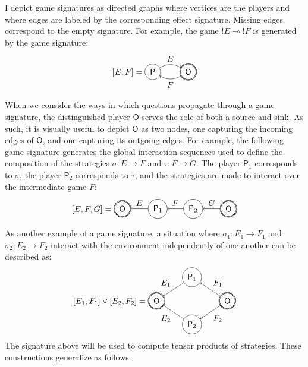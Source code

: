 \documentclass[11pt,oneside]{book}
\theoremstyle{definition}
\newcommand{\kw}[1]{\ensuremath{ \mathsf{#1} }}
\begin{document}
I depict game signatures as directed graphs
where vertices are the players and
where edges are labeled by the corresponding effect signature.
Missing edges correspond to the empty signature.
For example,
the game ${!E} \multimap {!F}$ is generated by
the game signature:
\[
  [E,F] =
  \begin{tikzpicture}[baseline=(O.base),scale=1.5]
    \node[circle,draw,double] (O) at (0,0) {$\kw{O}$};
    \node[circle,draw] (P) at (-1,0) {$\kw{P}$};
    \path[->] (P) edge[bend left] node[above] {$E$} (O);
    \path[->] (O) edge[bend left] node[below] {$F$} (P);
  \end{tikzpicture}
\]

When we consider the ways in which questions propagate
through a game signature, %
the distinguished player $\kw{O}$ serves the role
of both a source and sink.
As such, it is visually useful
to depict $\kw{O}$ as two nodes,
one capturing the incoming edges of $\kw{O}$, and
one capturing its outgoing edges.
For example,
the following game signature
generates the global interaction sequences
used to define the composition
of the strategies
$\sigma : E \rightarrow F$ and $\tau : F \rightarrow G$.
The player $\kw{P}_1$ corresponds to $\sigma$,
the player $\kw{P}_2$ corresponds to $\tau$,
and the strategies are made to interact
over the intermediate game $F$:
\[
  [E,F,G] =
  \begin{tikzpicture}[baseline=(O1.base),scale=1.5]
    \node[circle,double,draw] (O1) at (0,0) {$\kw{O}$};
    \node[circle,draw] (P1) at (-1,0) {$\kw{P}_2$};
    \node[circle,draw] (P2) at (-2,0) {$\kw{P}_1$};
    \node[circle,double,draw] (O2) at (-3,0) {$\kw{O}$};
    \path[->] (O1) edge node[above] {$G$} (P1);
    \path[->] (P1) edge node[above] {$F$} (P2);
    \path[->] (P2) edge node[above] {$E$} (O2);
  \end{tikzpicture}
\]

As another example of a game signature,
a situation where
$\sigma_1 : E_1 \rightarrow F_1$ and
$\sigma_2 : E_2 \rightarrow F_2$
interact with the environment
independently of one another
can be described as:
\[
  [E_1,F_1] \vee [E_2,F_2] =
  \begin{tikzpicture}[baseline=(O.base),xscale=1.5]
    \node[circle,draw,double] (O1) at (+1,0) {$\kw{O}$};
    \node[circle,draw,double] (O2) at (-1,0) {$\kw{O}$};
    \node[circle,draw] (P1) at (0,+1) {$\kw{P}_1$};
    \node[circle,draw] (P2) at (0,-1) {$\kw{P}_2$};
    \path[->] (O1) edge node[auto=right] {$F_1$} (P1);
    \path[->] (P1) edge node[auto=right] {$E_1$} (O2);
    \path[->] (O1) edge node[auto=left] {$F_2$} (P2);
    \path[->] (P2) edge node[auto=left] {$E_2$} (O2);
  \end{tikzpicture}
\]
The signature above will be used to compute
tensor products of strategies.
These constructions generalize as follows.
\end{document}
